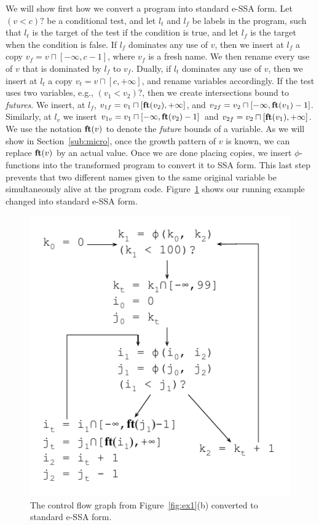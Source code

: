 \documentclass[preprint]{sigplanconf}
\newcommand{\fun}[1]{\mbox{\textbf{#1}}}
\begin{document}
We will show first how we convert a program into standard e-SSA form.
Let $(v < c)?$ be a conditional test, and let $l_t$ and $l_f$ be labels in
the program, such that $l_t$ is the target of the test if the condition is true,
and let $l_f$ is the target when the condition is false.
If $l_f$ dominates any use of $v$, then we insert at $l_f$ a copy
$v_f = v \sqcap [-\infty, c-1]$, where $v_f$ is a fresh name.
We then rename every use of $v$ that is dominated by $l_f$ to $v_f$.
Dually, if $l_t$ dominates any use of $v$, then we insert at $l_t$ a copy
$v_t = v \sqcap [c, +\infty]$, and rename variables accordingly.
If the test uses two variables, e.g., $(v_1 < v_2)?$, then we create
intersections bound to {\em futures}.
We insert, at $l_f$, $v_{1f} = v_1 \sqcap [\fun{ft}(v_2), +\infty]$,
and $v_{2f} = v_2 \sqcap [-\infty, \fun{ft}(v_1) - 1]$.
Similarly, at $l_v$ we insert
$v_{1v} = v_1 \sqcap [-\infty, \fun{ft}(v_2) - 1]$
and $v_{2f} = v_2 \sqcap [\fun{ft}(v_1), +\infty]$.
We use the notation $\fun{ft}(v)$ to denote the {\em future} bounds of a
variable.
As we will show in Section~\ref{sub:micro}, once the growth pattern of $v$ is
known, we can replace $\fun{ft}(v)$ by an actual value.
Once we are done placing copies, we insert $\phi$-functions into the
transformed program to convert it to SSA form.
This last step prevents that two different names given to the same original
variable be simultaneously alive at the program code.
Figure~\ref{fig:ex_standard_eSSA} shows our running example changed into
standard e-SSA form.

\begin{figure}[t!]
\begin{center}
\includegraphics[width=0.7\columnwidth]{images/ex_standard_eSSA}
\end{center}
\caption{\label{fig:ex_standard_eSSA}
The control flow graph from Figure~\ref{fig:ex1}(b) converted to standard
e-SSA form.}
\end{figure}
\end{document}
